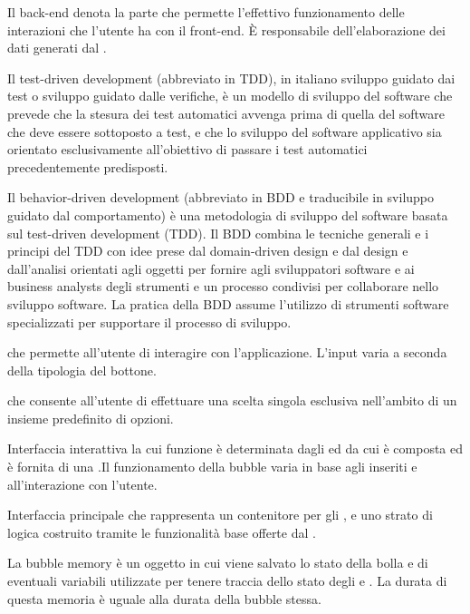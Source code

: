 Il back-end denota la parte che permette l’effettivo funzionamento delle interazioni che l’utente ha con il front-end. \`{E} responsabile dell’elaborazione dei dati generati dal .

Il test-driven development (abbreviato in TDD), in italiano sviluppo guidato dai test o sviluppo guidato dalle verifiche, è un modello di sviluppo del software che prevede che la stesura dei test automatici avvenga prima di quella del software che deve essere sottoposto a test, e che lo sviluppo del software applicativo sia orientato esclusivamente all'obiettivo di passare i test automatici precedentemente predisposti.

Il behavior-driven development (abbreviato in BDD e traducibile in sviluppo guidato dal comportamento) è una metodologia di sviluppo del software basata sul test-driven development (TDD). Il BDD combina le tecniche generali e i principi del TDD con idee prese dal domain-driven design e dal design e dall'analisi orientati agli oggetti per fornire agli sviluppatori software e ai business analysts degli strumenti e un processo condivisi per collaborare nello sviluppo software. La pratica della BDD assume l'utilizzo di strumenti software specializzati per supportare il processo di sviluppo.

 che permette all’utente di interagire con l’applicazione. L’input varia a seconda della tipologia del bottone.  

 che consente all'utente di effettuare una scelta singola esclusiva nell'ambito di un insieme predefinito di opzioni.

Interfaccia interattiva la cui funzione è determinata dagli   ed  da cui è composta ed è fornita di una  .Il funzionamento della bubble varia in base agli  inseriti e all'interazione con l'utente.

Interfaccia principale che rappresenta un contenitore per gli ,  e uno strato di logica costruito tramite le funzionalit\`a base offerte dal .

La bubble memory è un oggetto  in cui viene salvato lo stato della bolla e di eventuali variabili utilizzate per tenere traccia dello stato degli  e . La durata di questa memoria è uguale alla durata della bubble stessa.

